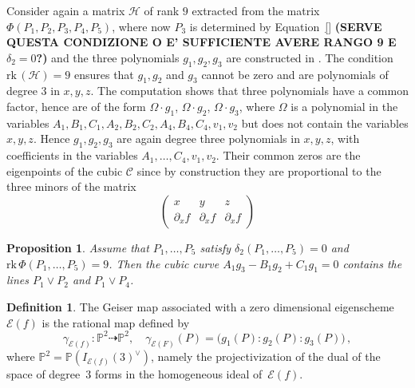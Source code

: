 \documentclass{amsart}
\theoremstyle{plain}
\newtheorem{prop}[lemma]{Proposition}
\theoremstyle{definition}
\newtheorem{definition}[lemma]{Definition}
\newcommand{\p}{\mathbb{P}}
\newcommand{\Eig}[1]{\mathcal{E}\!\left( {#1} \right)}
\newcommand{\cbc}{\ensuremath{\mathcal{C}}}
\newcommand{\rk}{\ensuremath{\mathrm{rk}}}
\begin{document}
Consider again a matrix $\mathcal{H}$ of rank $9$ extracted from
the matrix $\Phi(P_1, P_2, P_3, P_4, P_5)$, where now $P_3$ is determined by Equation~\eqref{} \textbf{(SERVE QUESTA CONDIZIONE O E' SUFFICIENTE AVERE RANGO 9 E $\delta_2 = 0$?)}
and the three polynomials $g_1, g_2, g_3$ are constructed
in . The condition
$\rk \,(\mathcal{H}) = 9$ ensures that
$g_1, g_2$ and $g_3$ cannot be zero and are polynomials of degree
$3$ in $x, y, z$.
The computation shows that three polynomials have a common factor,
hence are of the form $\Omega \cdot g_1$, $\Omega \cdot g_2$, $\Omega \cdot g_3$, where
$\Omega$ is a polynomial in the variables
$A_1, B_1, C_1, A_2, B_2, C_2, A_4, B_4, C_4, v_1, v_2$ but
does not contain the variables $x, y, z$.
Hence $g_1, g_2, g_3$ are again
degree three polynomials in $x, y, z$, with coefficients in the variables
$A_1, \dots, C_4, v_1, v_2$. Their common zeros are the eigenpoints of the
cubic $\cbc$ since by construction they are proportional to the three minors of the matrix
%
\[
 \left(
 \begin{array}{ccc}
  x & y & z \\
  \partial_x f & \partial_x f & \partial_x f
 \end{array}
 \right)
\]
%

\begin{prop}
\label{proposition:G_split}
 Assume that $P_1, \dots, P_5 $ satisfy $\delta_2(P_1, \dotsc, P_5) = 0$ and $\rk \, \Phi(P_1, \dotsc, P_5) = 9$. Then the cubic curve $A_1 g_3 - B_1 g_2 + C_1 g_1=0$ contains the lines $P_1 \vee P_2$ and $P_1 \vee P_4$.

\end{prop}
\begin{definition}
%
The Geiser map associated with a zero dimensional eigenscheme $\Eig{f}$ is the rational map defined by
%
\[
\gamma_{\Eig{f}} \colon \p ^2 \dasharrow \p^2, \quad
\gamma_{\Eig{F}} (P) = \bigl( g_1(P):g_2(P):g_3(P) \bigr) \,,
\]
%
where $\p^2 = \p(I_{\Eig{f}}(3)^{\vee})$, namely the projectivization of the dual of the space of degree~$3$ forms in the homogeneous ideal of~$\Eig{f}$.
\end{definition}
\end{document}
